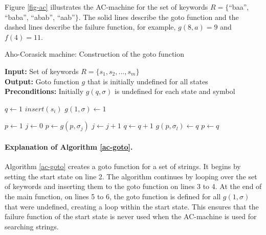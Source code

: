 \documentclass[english,twoside,censored,csm,algorithms-track-2020]{HYthesisML}
\theoremstyle{plain}
\theoremstyle{definition}
\begin{document}
Figure \ref{fig-ac} illustrates the AC-machine for the set of
keywords $R=\{$``baa'', ``baba'', ``abab'', ``aab''$\}$. The solid lines describe the goto function
and the dashed lines describe the failure function, for example, $g(8, a) = 9$ and $f(4)=11$.

\begin{algorithm}[t]
  
  \caption{Aho-Corasick machine: Construction of the goto function} \label{ac-goto}
  \hspace*{\algorithmicindent} \textbf{Input:} Set of keywords $R = \{s_1,s_2,...,s_m\}$\\
  \hspace*{\algorithmicindent} \textbf{Output:} Goto function $g$ that is initially undefined for all states\\
  \hspace*{\algorithmicindent} \textbf{Preconditions:} Initially $g(q,\sigma)$ is undefined for each state and symbol
  
      \begin{algorithmic}[1]

          \State $q\gets 1$
            \State $insert(s_i)$
          \EndFor
            \State $g(1,\sigma)\gets 1$
          \EndFor
        \EndFunction


          \State $p\gets 1$
          \State $j\gets 0$
            \State $p\gets g(p,\sigma_j)$
            \State $j\gets j+1$
          \EndWhile
            \State $q\gets q+1$
            \State $g(p,\sigma_l)\gets q$
            \State $p\gets q$
          \EndFor
        \EndFunction
      \end{algorithmic}
      
\end{algorithm}


  \paragraph{Explanation of Algorithm \ref{ac-goto}.}
  Algorithm \ref{ac-goto} creates a goto function for a set of strings. It begins by setting the start state on line 2.
  The algorithm continues by looping over the set of keywords and inserting them to the
  goto function on lines 3 to 4. At the end of the main function, on lines 5 to 6,
  the goto function is defined for all $g(1,\sigma)$ that were undefined, creating a loop within
  the start state. This ensures that the failure function of the start state is never used when the
  AC-machine is used for searching strings.
\end{document}
